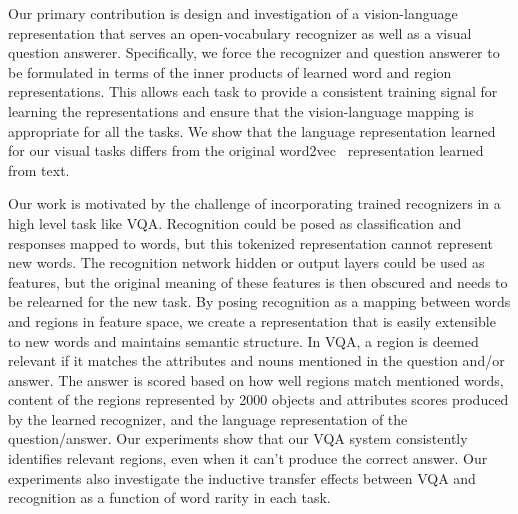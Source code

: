 \documentclass[10pt,twocolumn,letterpaper]{article}
\begin{document}
Our primary contribution is design and investigation of a vision-language representation that serves an open-vocabulary recognizer as well as a visual question answerer.  Specifically, we force the recognizer and question answerer to be formulated in terms of the inner products of learned word and region representations. This allows each task to provide a consistent training signal for learning the representations and ensure that the vision-language mapping is appropriate for all the tasks.  We show that the language representation learned for our visual tasks differs from the original word2vec~\cite{word2vec} representation learned from text.

Our work is motivated by the challenge of incorporating trained recognizers in a high level task like VQA. Recognition could be posed as classification and responses mapped to words, but this tokenized representation cannot represent new words.  The recognition network hidden or output layers could be used as features, but the original meaning of these features is then obscured and needs to be relearned for the new task.  By posing recognition as a mapping between words and regions in feature space, we create a representation that is easily extensible to new words and maintains semantic structure. In VQA, a region is deemed relevant if it matches the attributes and nouns mentioned in the question and/or answer.  The answer is scored based on how well regions match mentioned words, content of the regions represented by 2000 objects and attributes scores produced by the learned recognizer, and the language representation of the question/answer. Our experiments show that our VQA system consistently identifies relevant regions, even when it can't produce the correct answer.  Our experiments also investigate the inductive transfer effects between VQA and recognition as a function of word rarity in each task.



\end{document}
